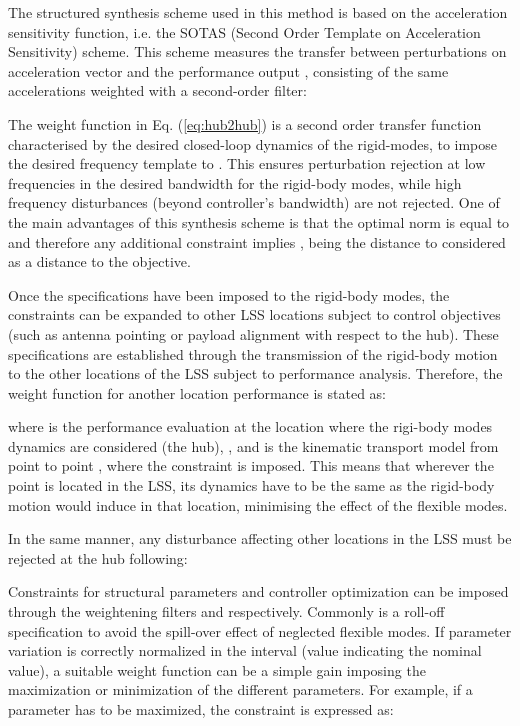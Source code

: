 \documentclass{ifacconf}
\begin{document}
The structured  synthesis scheme used in this method is based on the acceleration sensitivity function,  \citep{Fezans2008_Hinf} i.e. the SOTAS (Second Order Template on Acceleration Sensitivity) scheme. This scheme measures the transfer between perturbations on acceleration vector  and the performance output , consisting of the same accelerations  weighted with a second-order filter:



The weight function  in Eq. (\ref{eq:hub2hub}) is a second order transfer function characterised by the desired closed-loop dynamics of the rigid-modes, to impose the desired frequency template to . This ensures perturbation rejection at low frequencies in the desired bandwidth  for the rigid-body modes, while high frequency disturbances (beyond controller's bandwidth) are not rejected. One of the main advantages of this synthesis scheme is that the optimal norm  is equal to  and therefore any additional constraint implies , being the distance to  considered as a distance to the objective.

Once the specifications have been imposed to the rigid-body modes, the constraints can be expanded to other LSS locations subject to control objectives (such as antenna pointing or payload alignment with respect to the hub). These specifications are established through the transmission of the rigid-body motion to the other locations of the LSS subject to performance analysis. Therefore, the weight function for another location performance  is stated as:



where  is the performance evaluation at the location where the rigi-body modes dynamics are considered (the hub), , and  is the kinematic transport model from point  to point , where the constraint is imposed. This means that wherever the point  is located in the LSS, its dynamics have to be the same as the rigid-body motion would induce in that location, minimising the effect of the flexible modes.

In the same manner, any disturbance affecting other locations in the LSS must be rejected at the hub following:





Constraints for structural parameters  and controller  optimization can be imposed through the weightening filters  and  respectively. Commonly  is a roll-off specification to avoid the spill-over effect of neglected flexible modes. If parameter variation is correctly normalized in the interval  (value  indicating the nominal value), a suitable weight function  can be a simple gain imposing the maximization or minimization of the different parameters. For example, if a parameter  has to be maximized, the constraint is expressed as:
\end{document}
